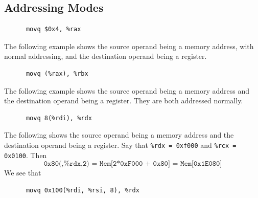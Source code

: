 \subsection{Addressing Modes}

  \begin{example}
    \label{ex:immediate-addressing}
    \begin{lstlisting} 
      movq $0x4, %rax
    \end{lstlisting}
  \end{example}

  \begin{example}
    \label{ex:normal-addressing}
    The following example shows the source operand being a memory address, with normal addressing, and the destination operand being a register.  
    \begin{lstlisting} 
      movq (%rax), %rbx
    \end{lstlisting}
  \end{example}

  \begin{example}
    \label{ex:displacement-addressing}
    The following example shows the source operand being a memory address and the destination operand being a register. They are both addressed normally. 
    \begin{lstlisting} 
      movq 8(%rdi), %rdx
    \end{lstlisting}
  \end{example}

  \begin{example}
    \label{ex:indexed-addressing}
    The following shows the source operand being a memory address and the destination operand being a register. Say that \texttt{\%rdx = 0xf000} and \texttt{\%rcx = 0x0100}. Then 
    \begin{equation}
      \texttt{0x80(,\%rdx,2) = Mem[2*0xF000 + 0x80] = Mem[0x1E080]}
    \end{equation}
    We see that 
    \begin{lstlisting} 
      movq 0x100(%rdi, %rsi, 8), %rdx
    \end{lstlisting}
  \end{example}

